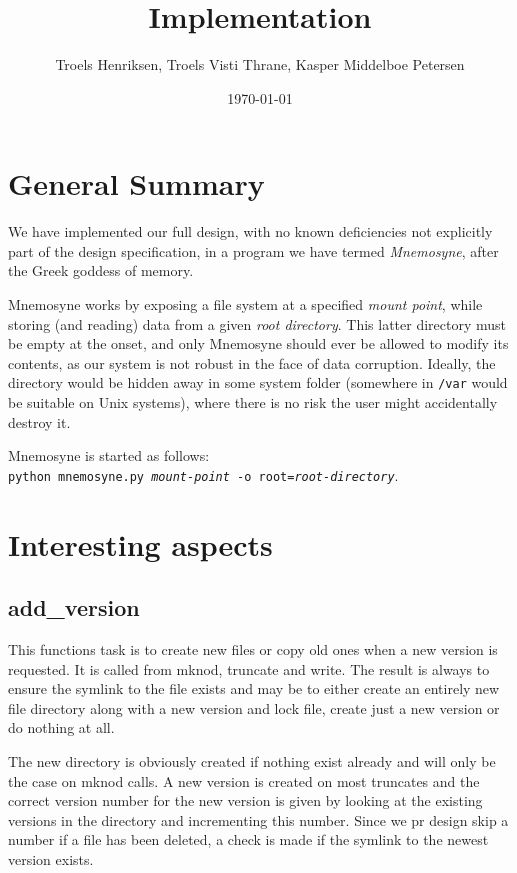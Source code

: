 \documentclass[12pt]{article}
\author{
        Troels Henriksen, Troels Visti Thrane, Kasper Middelboe Petersen
}
\date{\today}
\title{Implementation}
\begin{document}
 
\maketitle

\section{General Summary}

We have implemented our full design, with no known deficiencies not
explicitly part of the design specification, in a program we have
termed \textit{Mnemosyne}, after the Greek goddess of memory.

Mnemosyne works by exposing a file system at a specified \textit{mount
  point}, while storing (and reading) data from a given \textit{root
  directory}.  This latter directory must be empty at the onset, and
only Mnemosyne should ever be allowed to modify its contents, as our
system is not robust in the face of data corruption.  Ideally, the
directory would be hidden away in some system folder (somewhere in
\texttt{/var} would be suitable on Unix systems), where there is no
risk the user might accidentally destroy it.

Mnemosyne is started as follows:\\
\texttt{python mnemosyne.py \textit{mount-point} -o
  root=\textit{root-directory}}.

\section{Interesting aspects}

\subsection{add\_version}

This functions task is to create new files or copy old ones when a new
version is requested. It is called from mknod, truncate and write. The
result is always to ensure the symlink to the file exists and may be
to either create an entirely new file directory along with a new
version and lock file, create just a new version or do nothing at all.

The new directory is obviously created if nothing exist already and
will only be the case on mknod calls. A new version is created on most
truncates and the correct version number for the new version is given
by looking at the existing versions in the directory and incrementing
this number. Since we pr design skip a number if a file has been
deleted, a check is made if the symlink to the newest version exists.
\end{document}
